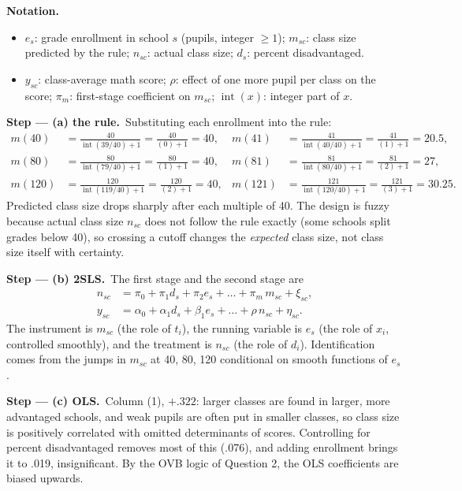 \documentclass[11pt,a4paper]{article}
\newenvironment{notacao}{\par\smallskip\noindent\textbf{Notation.}\begin{itemize}[leftmargin=1.4em,topsep=1pt,itemsep=0pt]\small}{\end{itemize}}
\newcommand{\passo}[2]{\par\smallskip\noindent\textbf{Step --- #1.}~#2}
\begin{document}
\begin{sol}
\begin{notacao}
\item $e_s$: grade enrollment in school $s$ (pupils, integer $\geq1$); $m_{sc}$: class size predicted by the
rule; $n_{sc}$: actual class size; $d_s$: percent disadvantaged.
\item $y_{sc}$: class-average math score; $\rho$: effect of one more pupil per class on the score;
$\pi_m$: first-stage coefficient on $m_{sc}$; $\operatorname{int}(x)$: integer part of $x$.
\end{notacao}

\passo{(a) the rule}{Substituting each enrollment into the rule:
\begin{align}
m(40)&=\frac{40}{\operatorname{int}(39/40)+1}=\frac{40}{(0)+1}=40,&
m(41)&=\frac{41}{\operatorname{int}(40/40)+1}=\frac{41}{(1)+1}=20.5,\label{q6:m1}\\
m(80)&=\frac{80}{\operatorname{int}(79/40)+1}=\frac{80}{(1)+1}=40,&
m(81)&=\frac{81}{\operatorname{int}(80/40)+1}=\frac{81}{(2)+1}=27,\label{q6:m2}\\
m(120)&=\frac{120}{\operatorname{int}(119/40)+1}=\frac{120}{(2)+1}=40,&
m(121)&=\frac{121}{\operatorname{int}(120/40)+1}=\frac{121}{(3)+1}=30.25.\label{q6:m3}
\end{align}
Predicted class size drops sharply after each multiple of 40. The design is fuzzy because actual class size
$n_{sc}$ does not follow the rule exactly (some schools split grades below 40), so crossing a cutoff changes
the \emph{expected} class size, not class size itself with certainty.}

\passo{(b) 2SLS}{The first stage and the second stage are
\begin{align}
n_{sc}&=\pi_0+\pi_1d_s+\pi_2e_s+\dots+\pi_m\,m_{sc}+\xi_{sc},\label{q6:fs}\\
y_{sc}&=\alpha_0+\alpha_1d_s+\beta_1e_s+\dots+\rho\,n_{sc}+\eta_{sc}.\label{q6:ss}
\end{align}
The instrument is $m_{sc}$ (the role of $t_i$), the running variable is $e_s$ (the role of $x_i$, controlled
smoothly), and the treatment is $n_{sc}$ (the role of $d_i$). Identification comes from the jumps in
$m_{sc}$ at 40, 80, 120 conditional on smooth functions of $e_s$.}

\passo{(c) OLS}{Column (1), $+.322$: larger classes are found in larger, more advantaged schools, and
weak pupils are often put in smaller classes, so class size is positively correlated with omitted
determinants of scores. Controlling for percent disadvantaged removes most of this (.076), and adding
enrollment brings it to .019, insignificant. By the OVB logic of Question 2, the OLS coefficients are
biased upwards.}


\end{sol}
\end{document}

